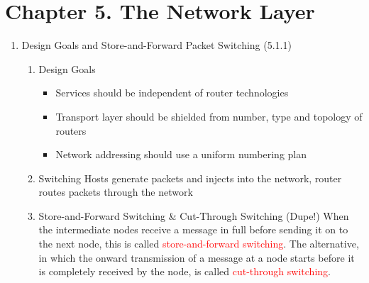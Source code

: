 \documentclass[a4paper,10pt]{article}
\newcommand{\red}[1]{\textcolor{red}{#1}}
\begin{document}
\newpage\section*{Chapter 5. The Network Layer}
\begin{enumerate}
  \item Design Goals and Store-and-Forward Packet Switching (5.1.1)
    \begin{enumerate}
      \item Design Goals
        \begin{itemize}
          \item Services should be independent of router technologies
          \item Transport layer should be shielded from number, type and topology of routers
          \item Network addressing should use a uniform numbering plan
        \end{itemize}
      \item Switching
        \newline Hosts generate packets and injects into the network, router routes packets through the network
      \item Store-and-Forward Switching \& Cut-Through Switching
        \newline (Dupe!) When the intermediate nodes receive a message in full before sending it on to the next node, this is called \red{store-and-forward switching}.
        \newline The alternative, in which the onward transmission of a message at a node starts before it is completely received by the node, is called \red{cut-through switching}.
    \end{enumerate}
    

\end{enumerate}
\end{document}
